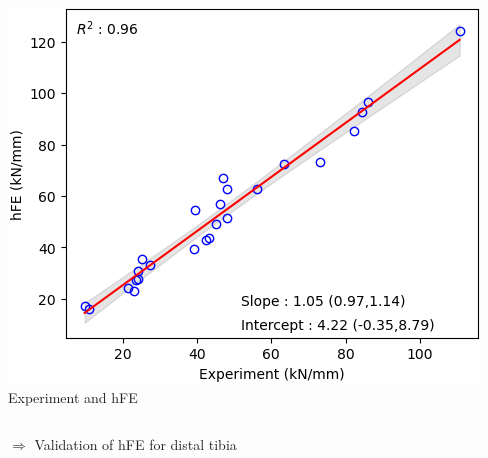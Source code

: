 \documentclass[xcolor=table,11pt]{beamer}
\begin{document}
\begin{frame}
\begin{columns}
			\includegraphics[width=1.0\linewidth]{Figures/hFEvsExp_Stiffness}\\
			Experiment and hFE
		\end{columns}
		\vspace{10mm}
		\centering
		$\Rightarrow$ Validation of hFE	for distal tibia
	\end{frame}


\end{document}

